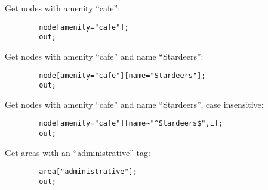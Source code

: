 \documentclass[main.tex]{subfiles}
\begin{document}
\begin{example}
    Get nodes with amenity ``cafe'':
    \begin{lstwrap}\begin{lstlisting}
        node[amenity="cafe"];
        out;
    \end{lstlisting}\end{lstwrap}
    
    Get nodes with amenity ``cafe'' and name ``Stardeers'':
    \begin{lstwrap}\begin{lstlisting}
        node[amenity="cafe"][name="Stardeers"];
        out;
    \end{lstlisting}\end{lstwrap}

    Get nodes with amenity ``cafe'' and name ``Stardeers'', case insensitive:
    \begin{lstwrap}\begin{lstlisting}
        node[amenity="cafe"][name~"^Stardeers$",i];
        out;
    \end{lstlisting}\end{lstwrap}

    Get areas with an ``administrative'' tag:
    \begin{lstwrap}\begin{lstlisting}
        area["administrative"];
        out;
    \end{lstlisting}\end{lstwrap}
\end{example}
\end{document}
